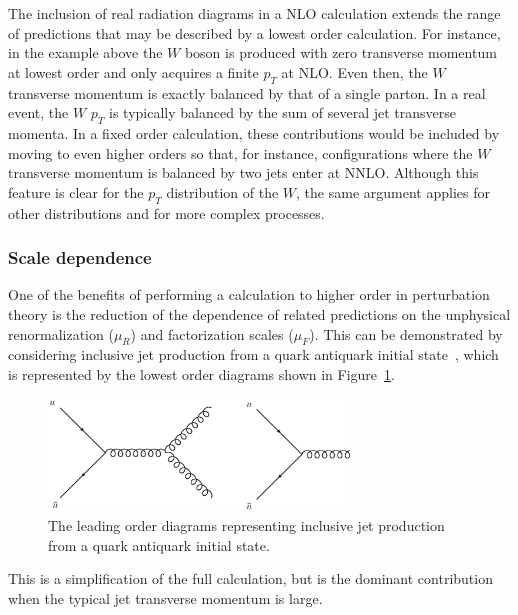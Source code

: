 \documentclass[12pt]{iopart}
\begin{document}
The inclusion of real radiation diagrams in a NLO calculation extends
the range of predictions that may be described by a lowest order calculation. For
instance, in the example above the $W$ boson is produced with zero transverse
momentum at lowest order and only acquires a finite $p_T$ at NLO. Even then, the
$W$ transverse momentum is exactly balanced by that of a single parton. In a real
event, the $W$ $p_T$ is typically balanced by the sum of several jet transverse momenta. 
In a fixed order calculation, these contributions would be included by moving to
even higher orders so that, for instance, configurations where the $W$ transverse
momentum is balanced by two jets enter at NNLO. Although this feature is clear
for the $p_T$ distribution of the $W$, the same argument applies for
other distributions and for more complex processes.


\subsubsection{Scale dependence}
\label{sec:scaledep}

One of the benefits of performing a calculation to higher order in perturbation
theory is the reduction of the dependence of related predictions on the
unphysical renormalization ($\mu_R$) and factorization scales ($\mu_F$).
This can be demonstrated by considering inclusive jet production from a
quark antiquark initial state~\cite{Stump:2003yu}, which is represented by the lowest order
diagrams shown in Figure~\ref{fig:jets}.
%
\begin{figure}[t]
\begin{center}
\includegraphics[width=8cm]{jets.ps}
\end{center}
\vspace*{-0.5cm}
\caption{The leading order diagrams representing inclusive jet production from a
quark antiquark initial state.}
\label{fig:jets}
\end{figure}
This is a simplification of the full calculation, but is the dominant contribution when the typical
jet transverse momentum is large.
\end{document}
